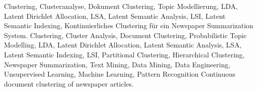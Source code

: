 \HAWAbstractPage
  {
    Clustering, 
    Clusteranalyse, 
    Dokument Clustering,
    Topic Modellierung, 
    LDA, Latent Dirichlet Allocation,
    LSA, Latent Semantic Analysis,
    LSI, Latent Semantic Indexing, 
  }
  { 
    Kontinuierliches Clustering für ein Newspaper Summarization System.
  }
  { 
    Clustering, 
    Cluster Analysis, 
    Document Clustering, 
    Probabilistic Topic Modelling, 
    LDA, Latent Dirichlet Allocation,
    Latent Semantic Analysis, LSA, 
    Latent Semantic Indexing, LSI, 
    Partitional Clustering,
    Hierarchical Clustering,
    Newspaper Summarization,
    Text Mining, 
    Data Mining, 
    Data Engineering,
    Unsupervised Learning, 
    Machine Learning,
    Pattern Recognition
  }
  {
    Continuous document clustering of newspaper articles.
  }